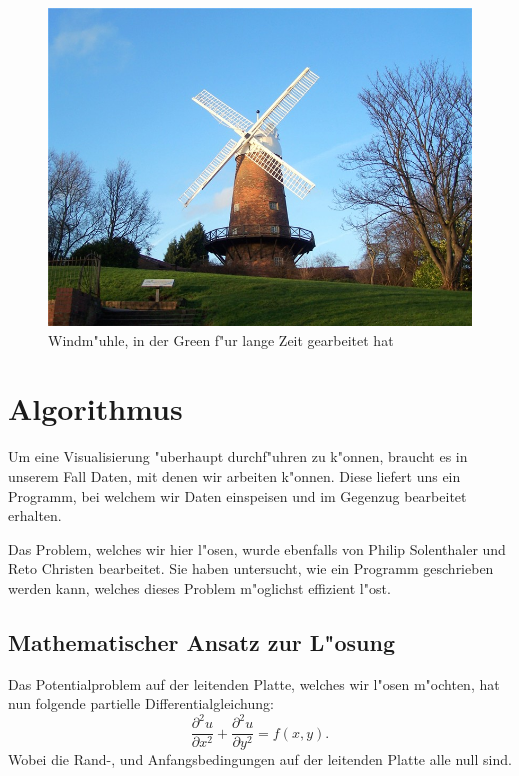\begin{refsection}
\begin{figure}                    
\centering 
\includegraphics[width=\hsize]{green/images/greens_windmill.jpg} 
\caption{Windm"uhle, in der Green f"ur lange Zeit gearbeitet hat} 
\label{fig:abb1} 
\end{figure} 
	
\section{Algorithmus}
Um eine Visualisierung "uberhaupt durchf"uhren zu k"onnen, braucht
es in unserem Fall Daten, mit denen wir arbeiten k"onnen. Diese
liefert uns ein Programm, bei welchem wir Daten einspeisen und im
Gegenzug bearbeitet erhalten.
	
Das Problem, welches wir hier l"osen, wurde ebenfalls von Philip
Solenthaler und Reto Christen bearbeitet. Sie haben untersucht, wie
ein Programm geschrieben werden kann, welches dieses Problem
m"oglichst effizient l"ost.

\subsection{Mathematischer Ansatz zur L"osung}

Das Potentialproblem auf der leitenden Platte, welches wir l"osen
m"ochten, hat nun folgende partielle Differentialgleichung:
\begin{equation}\label{eq:gleichung}
\dfrac{\partial^2 u}{\partial x^2}+\dfrac{\partial^2 u}{\partial y^2} = f(x,y).
\end{equation}
Wobei die Rand-, und Anfangsbedingungen auf der leitenden Platte alle null sind. 
	

\end{refsection}
